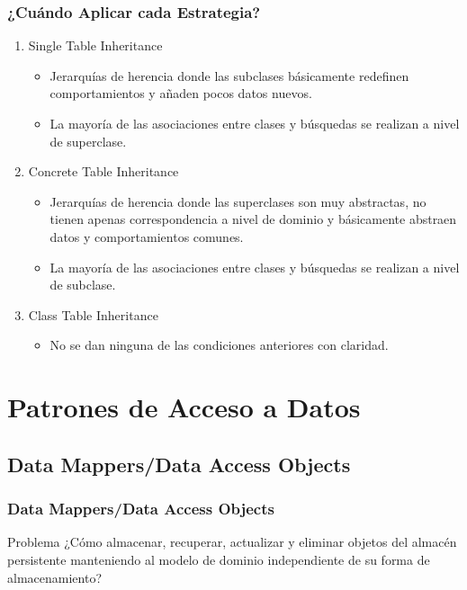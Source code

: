 \documentclass[a4paper,slidestop,xcolor=pst,blue]{beamer}
\begin{document}
\begin{frame}[c]
    \frametitle{¿Cuándo Aplicar cada Estrategia?}
    \begin{enumerate}
        \item<1-> Single Table Inheritance
            \begin{itemize}
                \item<2-> Jerarquías de herencia donde las subclases básicamente redefinen comportamientos y añaden pocos datos nuevos.
                \item<3-> La mayoría de las asociaciones entre clases y búsquedas se realizan a nivel de superclase.
            \end{itemize}
        \item<4-> Concrete Table Inheritance
            \begin{itemize}
                \item<5-> Jerarquías de herencia donde las superclases son muy abstractas, no tienen apenas correspondencia a nivel de dominio y básicamente abstraen datos y comportamientos comunes.
                \item<6-> La mayoría de las asociaciones entre clases y búsquedas se realizan a nivel de subclase.
            \end{itemize}
        \item<7-> Class Table Inheritance
            \begin{itemize}
                \item<8-> No se dan ninguna de las condiciones anteriores con claridad.
            \end{itemize}
    \end{enumerate}
\end{frame}

\section{Patrones de Acceso a Datos}

\subsection{Data Mappers/Data Access Objects}

\begin{frame}[c]
    \frametitle{Data Mappers/Data Access Objects}
    \begin{block}{Problema}
        ¿Cómo almacenar, recuperar, actualizar y eliminar objetos del almacén persistente manteniendo al modelo de dominio independiente de su forma de almacenamiento?
    \end{block}
\end{frame}
\end{document}
